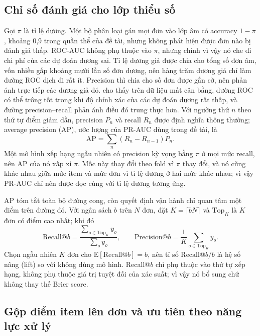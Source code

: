 \subsection{Chỉ số đánh giá cho lớp thiểu số}\label{sec:th-metrics}

Gọi $\pi$ là tỉ lệ dương. Một bộ phân loại gán mọi đơn vào lớp âm có accuracy $1-\pi$, khoảng 0,9 trong quần thể của đề tài, nhưng không phát hiện được đơn nào bị đánh giá thấp. ROC-AUC không phụ thuộc vào $\pi$, nhưng chính vì vậy nó che đi chi phí của các dự đoán dương sai. Tỉ lệ dương giả được chia cho tổng số đơn âm, vốn nhiều gấp khoảng mười lần số đơn dương, nên hàng trăm dương giả chỉ làm đường ROC dịch đi rất ít. Precision thì chia cho số đơn được gắn cờ, nên phản ánh trực tiếp các dương giả đó. \textcite{saito2015} cho thấy trên dữ liệu mất cân bằng, đường ROC có thể trông tốt trong khi độ chính xác của các dự đoán dương rất thấp, và đường precision--recall phản ánh điều đó trung thực hơn. Với ngưỡng thứ $n$ theo thứ tự điểm giảm dần, precision $P_n$ và recall $R_n$ được định nghĩa thông thường; average precision (AP), ước lượng của PR-AUC dùng trong đề tài, là
\begin{equation}\label{eq:th-ap}
  \mathrm{AP} = \sum_{n} \left( R_n - R_{n-1} \right) P_n .
\end{equation}
Một mô hình xếp hạng ngẫu nhiên có precision kỳ vọng bằng $\pi$ ở mọi mức recall, nên AP của nó xấp xỉ $\pi$. Mốc này thay đổi theo fold vì $\pi$ thay đổi, và nó cũng khác nhau giữa mức item và mức đơn vì tỉ lệ dương ở hai mức khác nhau; vì vậy PR-AUC chỉ nên được đọc cùng với tỉ lệ dương tương ứng.

AP tóm tắt toàn bộ đường cong, còn quyết định vận hành chỉ quan tâm một điểm trên đường đó. Với ngân sách $b$ trên $N$ đơn, đặt $K = \lceil bN \rceil$ và $\mathrm{Top}_K$ là $K$ đơn có điểm cao nhất; khi đó
\begin{equation}\label{eq:th-recallk}
  \mathrm{Recall@}b = \frac{\sum_{o \in \mathrm{Top}_K} y_o}{\sum_{o} y_o}, \qquad
  \mathrm{Precision@}b = \frac{1}{K} \sum_{o \in \mathrm{Top}_K} y_o .
\end{equation}
Chọn ngẫu nhiên $K$ đơn cho $\mathrm{E}[\mathrm{Recall@}b] = b$, nên tỉ số $\mathrm{Recall@}b / b$ là hệ số nâng (lift) so với không dùng mô hình. Recall@$b$ chỉ phụ thuộc vào thứ tự xếp hạng, không phụ thuộc giá trị tuyệt đối của xác suất; vì vậy nó bổ sung chứ không thay thế Brier score.

\subsection{Gộp điểm item lên đơn và ưu tiên theo năng lực xử lý}\label{sec:th-aggregation}

